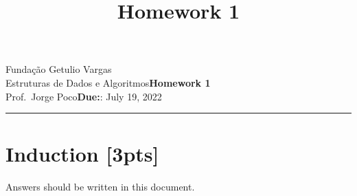 \documentclass{article}
\title{Homework 1}
\date{}
\newcommand{\assignment}{Homework 1}
\newcommand{\duedate}{July 19, 2022}
\begin{document}
Fundação Getulio Vargas\hfill\\
Estruturas de Dados e Algoritmos\hfill\textbf{\assignment}\\
Prof.\ Jorge Poco\hfill\textbf{Due:}: \duedate\\
\smallskip\hrule\bigskip

{\let\newpage\relax\maketitle}
\maketitle


\section{Induction [3pts]}
Answers should be written in this document. 
\end{document}
